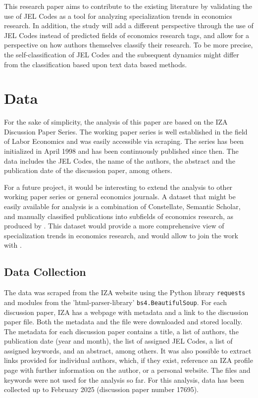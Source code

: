 \documentclass[11pt, a4paper, leqno]{article}
\begin{document}
This research paper aims to contribute to the existing literature by validating the use of JEL Codes as a tool for analyzing specialization trends in economics research.
In addition, the study will add a different perspective through the use of JEL Codes instead of predicted fields of economics research tags, and allow for a perspective on how authors themselves classify their research.
To be more precise, the self-classification of JEL Codes and the subsequent dynamics might differ from the classification based upon text data based methods.

\section{Data}
For the sake of simplicity, the analysis of this paper are based on the IZA Discussion Paper Series.
The working paper series is well established in the field of Labor Economics and was easily accessible via scraping.
The series has been initialized in April 1998 and has been continuously published since then.
The data includes the JEL Codes, the name of the authors, the abstract and the publication date of the discussion paper, among others.

For a future project, it would be interesting to extend the analysis to other working paper series or general economics journals.
A dataset that might be easily available for analysis is a combination of Constellate, Semantic Scholar, and manually classified publications into subfields of economics research, as produced by \cite{galiani2023a}.
This dataset would provide a more comprehensive view of specialization trends in economics research, and would allow to join the work with .

\subsection{Data Collection}
The data was scraped from the IZA website using the Python library \texttt{requests} and modules from the 'html-parser-library' \texttt{bs4.BeautifulSoup}.
For each discussion paper, IZA has a webpage with metadata and a link to the discussion paper file.
Both the metadata and the file were downloaded and stored locally.
The metadata for each discussion paper contains a title, a list of authors, the publication date (year and month), the list of assigned JEL Codes, a list of assigned keywords, and an abstract, among others.
It was also possible to extract links provided for individual authors, which, if they exist, reference an IZA profile page with further information on the author, or a personal website.
The files and keywords were not used for the analysis so far.
For this analysis, data has been collected up to February 2025 (discussion paper number 17695).
\end{document}
